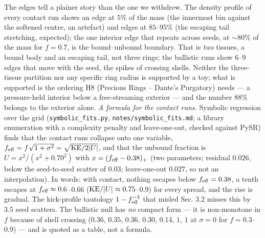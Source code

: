 \documentclass[
  11pt,
]{article}
\begin{document}
The edges tell a plainer story than the one we withdrew. The density
profile of every contact run shows an edge at \(5\%\) of the mass (the
innermost bin against the softened centre, an artefact) and edges at
\(85\)--\(95\%\) (the escaping tail stretching, expected); the one
interior edge that repeats across seeds, at \(\sim 80\%\) of the mass
for \(f = 0.7\), is the bound--unbound boundary. That is \emph{two}
tissues, a bound body and an escaping tail, not three rings; the
ballistic runs show \(6\)--\(9\) edges that move with the seed, the
spikes of crossing shells. Neither the three-tissue partition nor any
specific ring radius is supported by a toy; what is supported is the
ordering H8 (Precious Rings -- Dante's Purgatory) needs --- a
pressure-held interior below a free-streaming exterior --- and the
number \(88\%\) belongs to the exterior alone. \emph{A formula for the
contact runs.} Symbolic regression over the grid
(\texttt{symbolic\_fits.py}, \texttt{notes/symbolic\_fits.md}; a library
enumeration with a complexity penalty and leave-one-out, checked against
PySR) finds that the contact runs collapse onto one variable,
\(f_{\rm eff} = f\sqrt{1+\sigma^2} = \sqrt{{\rm KE}/2|U|}\), and that
the unbound fraction is \(U = x^2/(x^2 + 0.70^2)\) with
\(x = (f_{\rm eff} - 0.38)_+\) (two parameters; residual \(0.026\),
below the seed-to-seed scatter of \(0.03\); leave-one-out \(0.027\), so
not an interpolation). In words: with contact, nothing escapes below
\(f_{\rm eff} = 0.38\), a tenth escapes at
\(f_{\rm eff} \approx 0.6\)--\(0.66\)
(\({\rm KE}/|U| \approx 0.75\)--\(0.9\)) for every spread, and the rise
is gradual. The kick-profile tautology \(1 - f_{\rm eff}^{-3}\) that
misled Sec. 3.2 misses this by \(3.5\) seed scatters. The ballistic null
has \emph{no} compact form --- it is non-monotone in \(f\) because of
shell crossing (\(0.36\), \(0.35\), \(0.36\), \(0.30\), \(0.14\), \(1\),
\(1\) at \(\sigma = 0\) for \(f = 0.3\)--\(0.9\)) --- and is quoted as a
table, not a formula.
\end{document}
